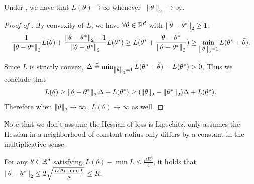 \begin{lemma}\label{lem:strictly_convex_loss}
	Under , we have that  $L(\theta)\to \infty$ whenever $\|\theta\|_2\to\infty$.
\end{lemma}
\begin{proof}[Proof of ]
By convexity of $L$, we have $\forall \theta\in\mathbb{R}^d$ with $\left\|\theta-\theta^*\right\|_2\ge 1$,
\begin{align}
	\frac{1}{\left\|\theta-\theta^*\right\|_2}L(\theta) + \frac{\left\|\theta-\theta^*\right\|_2 - 1}{\left\|\theta-\theta^*\right\|_2}L(\theta^*) \ge L(\theta^* + \frac{\theta - \theta^*}{\left\|\theta - \theta^*\right\|_2}) \ge \min_{\left\|\bar\theta\right\|_2 =1  } L(\theta^* +\bar\theta).
\end{align} 

Since $L$ is strictly convex, $\Delta \triangleq \min_{\left\|\bar\theta\right\|_2 =1  } L(\theta^* +\bar\theta) - L(\theta^*)>0$. Thus we conclude that 
\begin{align}
	L(\theta) \ge \left\|\theta-\theta^*\right\|_2\Delta + L(\theta^*)\ge 	(\left\|\theta\right\|_2 - \left\|\theta^*\right\|_2) \Delta + L(\theta^*).
\end{align}
Therefore when $\left\|\theta\right\|_2\to \infty$, $L(\theta)\to\infty$ as well.
\end{proof}

Note that we don't assume the Hessian of loss is Lipschitz.  only assumes the Hessian in a neighborhood of constant radius only differs by a constant in the multiplicative sense. 
\begin{lemma}\label{lem:small_loss_imply_small_distance}
For any $\theta\in\mathbb{R}^d$ satisfying $L(\theta)-\min L\le \frac{\mu R^2}{4}$, it holds that $\left\|\theta-\theta^*\right\|_2\le 2\sqrt{\frac{L(\theta) - \min L}{\mu}}\le R$.
\end{lemma}


